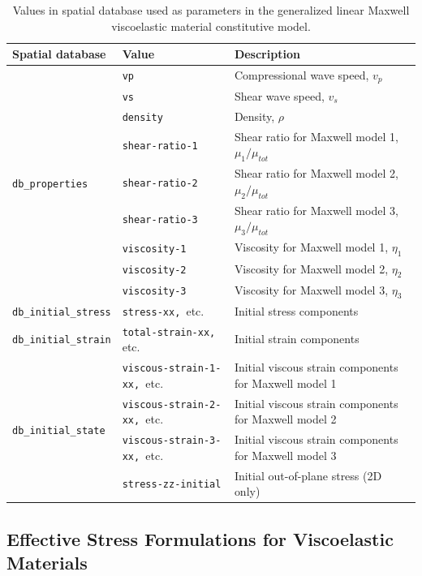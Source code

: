 \noindent \begin{center}
\begin{table}[H]
\noindent \centering{}\caption{\label{tab:genMaxwell}Values in spatial database used as parameters
in the generalized linear Maxwell viscoelastic material constitutive
model.}
\begin{tabular}{|l|l|l|}
\hline 
\textbf{Spatial database} & \textbf{Value} & \textbf{Description}\tabularnewline
\hline 
\hline 
\multirow{9}{*}{\texttt{db\_properties}} & \texttt{vp} & Compressional wave speed, $v_{p}$\tabularnewline
\cline{2-3} 
 & \texttt{vs} & Shear wave speed, $v_{s}$\tabularnewline
\cline{2-3} 
 & \texttt{density} & Density, $\rho$\tabularnewline
\cline{2-3} 
 & \texttt{shear-ratio-1} & Shear ratio for Maxwell model 1, $\mu_{1}/\mu_{tot}$\tabularnewline
\cline{2-3} 
 & \texttt{shear-ratio-2} & Shear ratio for Maxwell model 2, $\mu_{2}/\mu_{tot}$\tabularnewline
\cline{2-3} 
 & \texttt{shear-ratio-3} & Shear ratio for Maxwell model 3, $\mu_{3}/\mu_{tot}$\tabularnewline
\cline{2-3} 
 & \texttt{viscosity-1} & Viscosity for Maxwell model 1, $\eta_{1}$\tabularnewline
\cline{2-3} 
 & \texttt{viscosity-2} & Viscosity for Maxwell model 2, $\eta_{2}$\tabularnewline
\cline{2-3} 
 & \texttt{viscosity-3} & Viscosity for Maxwell model 3, $\eta_{3}$\tabularnewline
\hline 
\texttt{db\_initial\_stress} & \texttt{stress-xx, }etc. & Initial stress components\tabularnewline
\hline 
\texttt{db\_initial\_strain} & \texttt{total-strain-xx, }etc. & Initial strain components\tabularnewline
\hline 
\multirow{4}{*}{\texttt{db\_initial\_state}} & \texttt{viscous-strain-1-xx, }etc. & Initial viscous strain components for Maxwell model 1\tabularnewline
\cline{2-3} 
 & \texttt{viscous-strain-2-xx, }etc. & Initial viscous strain components for Maxwell model 2\tabularnewline
\cline{2-3} 
 & \texttt{viscous-strain-3-xx, }etc. & Initial viscous strain components for Maxwell model 3\tabularnewline
\cline{2-3} 
 & \texttt{stress-zz-initial} & Initial out-of-plane stress (2D only)\tabularnewline
\hline 
\end{tabular}
\end{table}

\par\end{center}


\subsection{\label{sub:Effective-Stress-Formulations-Viscoelastic}Effective
Stress Formulations for Viscoelastic Materials}

